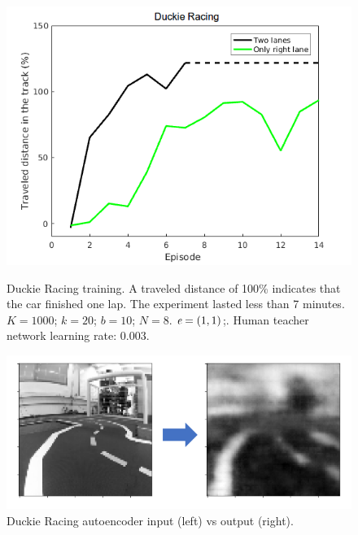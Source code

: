 \begin{figure}[h]
    \centering
    \begin{minipage}{.5\textwidth}
    \includegraphics[width=1.0\linewidth]{imagenes/cap3/racing_duckie_results.png}
    \vspace{-0.2cm}
    \caption[Duckie Racing training.]{Duckie Racing training. A traveled distance of 100\% indicates that the car finished one lap. The experiment lasted less than 7 minutes. $K = 1000$; $k=20$; $b = 10$; $N = 8$. $\emph{e}=(1, 1)$;. Human teacher network learning rate: $0.003$.}
    \label{fig:racing_duckie_results}
    \end{minipage}%
    \begin{minipage}{.5\textwidth}
    \centering
    \includegraphics[width=1.0\linewidth]{imagenes/cap3/AE_duckie2.png}
    \caption[Duckie Racing autoencoder input vs output.]{Duckie Racing autoencoder input (left) vs output (right).}
    \label{fig:AE_duckie}
    \end{minipage}
\end{figure}

